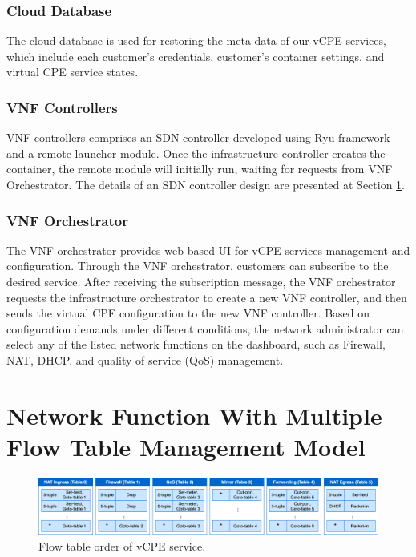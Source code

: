 \documentclass[conference]{IEEEtran}
\begin{document}
\subsubsection{Cloud Database}
The cloud database is used for restoring the meta data of our vCPE services, which include each customer’s credentials, customer's container settings, and virtual CPE service states.

\subsubsection{VNF Controllers}
VNF controllers comprises an SDN controller developed using Ryu framework \cite{ryu} and a remote launcher module. Once the infrastructure controller creates the container, the remote module will initially run, waiting for requests from VNF Orchestrator. The details of an SDN controller design are presented at Section \ref{sec:mft}.

\subsubsection{VNF Orchestrator}
The VNF orchestrator provides web-based UI for vCPE services management and configuration. Through the VNF orchestrator, customers can subscribe to the desired service. After receiving the subscription message, the VNF orchestrator requests the infrastructure orchestrator to create a new VNF controller, and then sends the virtual CPE configuration to the new VNF controller. Based on configuration demands under different conditions, the network administrator can select any of the listed network functions on the dashboard, such as Firewall, NAT, DHCP, and quality of service (QoS) management.





\section{Network Function With Multiple Flow Table Management Model} \label{sec:mft}

\begin{figure}[!t]
\centering
\includegraphics[width=\textwidth]{./figures/mft_table_overview_v4.png}
\caption{Flow table order of vCPE service.}
\label{fig:mft_table_overview}
\end{figure}
\end{document}
